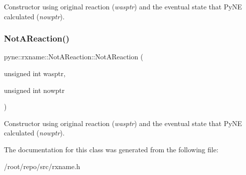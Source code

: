 Constructor using original reaction ({\itshape wasptr}) and the eventual state that Py\+NE calculated ({\itshape nowptr}). \mbox{\label{classpyne_1_1rxname_1_1_not_a_reaction_a7e0b63801e38b5d2c59edd635817fb80}} 
\subsubsection{\texorpdfstring{Not\+A\+Reaction()}{NotAReaction()}\hspace{0.1cm}{\footnotesize\ttfamily [7/7]}}
{\footnotesize\ttfamily pyne\+::rxname\+::\+Not\+A\+Reaction\+::\+Not\+A\+Reaction (\begin{DoxyParamCaption}\item[{unsigned int}]{wasptr,  }\item[{unsigned int}]{nowptr }\end{DoxyParamCaption})\hspace{0.3cm}{\ttfamily [inline]}}

Constructor using original reaction ({\itshape wasptr}) and the eventual state that Py\+NE calculated ({\itshape nowptr}). 

The documentation for this class was generated from the following file\+:\begin{DoxyCompactItemize}
\item 
/root/repo/src/rxname.\+h\end{DoxyCompactItemize}
